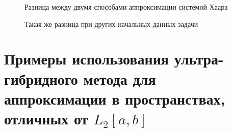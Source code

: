 ﻿\documentclass[a4paper, 12pt]{article}
\begin{document}
\begin{figure}[h!]
    \noindent{}
   \caption{Разница между двумя способами аппроксимации системой Хаара}
    \label{figCurves}
\end{figure}

\begin{figure}[h!]
    \noindent{}
   \caption{Такая же разница при других начальных данных задачи}
    \label{figCurves}
\end{figure}

\section{Примеры использования ультра-гибридного метода для аппроксимации в пространствах, отличных от $L_2[a,b]$ }
\end{document}
